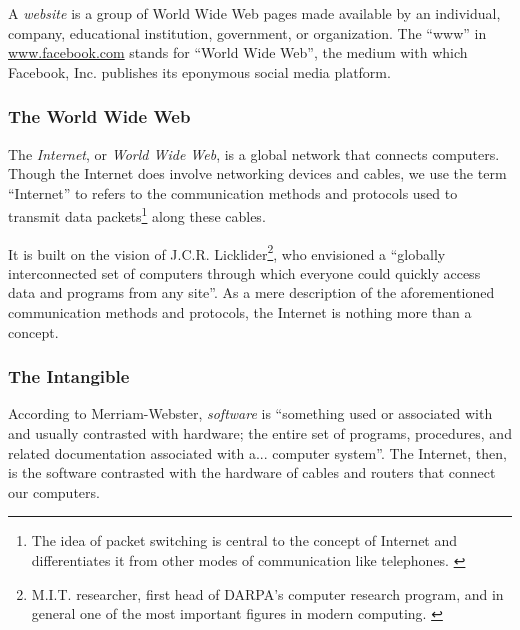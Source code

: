 \par A \emph{website} is a group of World Wide Web pages made available by an individual, company, educational institution, government, or organization. \cite{dictionary} The ``www'' in \url{www.facebook.com} stands for ``World Wide Web'', the medium with which Facebook, Inc. publishes its eponymous social media platform.

\subsubsection{The World Wide Web}


\par The \emph{Internet}, or \emph{World Wide Web}, is a global network that connects computers. \cite{internet} Though the Internet does involve networking devices and cables, we use the term ``Internet'' to refers to the communication methods and protocols used to transmit data packets\footnote{The idea of packet switching is central to the concept of Internet and differentiates it from other modes of communication like telephones. \cite{cpe464}} along these cables. \cite{cpe464}

\par It is built on the vision of J.C.R. Licklider\footnote{M.I.T. researcher, first head of DARPA's computer research program, and in general one of the most important figures in modern computing. \cite{internet}}, who envisioned a ``globally interconnected set of computers through which everyone could quickly access data and programs from any site''. As a mere description of the aforementioned communication methods and protocols, the Internet is nothing more than a concept.

\subsubsection{The Intangible}

\par According to Merriam-Webster, \emph{software} is ``something used or associated with and usually contrasted with hardware; the entire set of programs, procedures, and related documentation associated with a... computer system''. \cite{dictionary} The Internet, then, is the software contrasted with the hardware of cables and routers that connect our computers.

